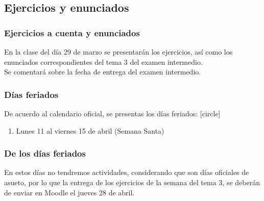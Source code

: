 \documentclass[12pt]{beamer}
\begin{document}
\subsection{Ejercicios y enunciados}

\begin{frame}
\frametitle{Ejercicios a cuenta y enunciados}
En la clase del día 29 de marzo se presentarán los ejercicios, así como los enunciados correspondientes del tema 3 del examen intermedio.
\\
\bigskip
Se comentará sobre la fecha de entrega del examen intermedio.
\end{frame}


\begin{frame}
\frametitle{Días feriados}
De acuerdo al calendario oficial, se presentas los días feriados:
\pause
{}
[circle]
\begin{enumerate}[<+->]
\item Lunes 11 al viernes 15 de abril (Semana Santa)
\end{enumerate}
\end{frame}
\begin{frame}
\frametitle{De los días feriados}
En estos días no tendremos actividades, considerando que son días oficiales de asueto, por lo que la entrega de los ejercicios de la semana del tema 3, se deberán de enviar en Moodle el jueves 28 de abril.
\end{frame}
\end{document}
